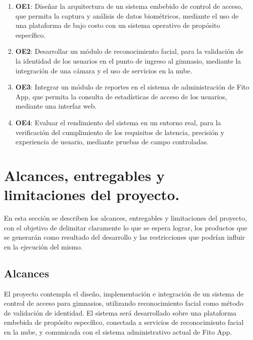 \begin{enumerate}
    \item \textbf{OE1}: Diseñar la arquitectura de un sistema embebido de control de acceso, %
    que permita la captura y análisis de datos biométricos, mediante el uso de una plataforma de bajo costo con un sistema operativo de propósito específico.

    \item \textbf{OE2}: Desarrollar un módulo de reconocimiento facial, para la validación de la identidad de los usuarios en el punto de ingreso al gimnasio, mediante la integración de una cámara y el uso de servicios en la nube. %
    
    \item \textbf{OE3}: Integrar un módulo de reportes en el sistema de administración de Fito App, %
    que permita la consulta de estadísticas de acceso de los usuarios, mediante %
    una interfaz web.
    
    \item \textbf{OE4}: Evaluar el rendimiento del sistema en un entorno real, para la verificación del cumplimiento de los requisitos de latencia, precisión y experiencia de usuario, mediante pruebas de campo controladas. %

\end{enumerate}

\section{Alcances, entregables y limitaciones del proyecto.}
En esta sección se describen los alcances, entregables y limitaciones del proyecto, con el objetivo de delimitar claramente lo que se espera lograr, los productos que se generarán como resultado del desarrollo y las restricciones que podrían influir en la ejecución del mismo.

\subsection{Alcances}
El proyecto contempla el diseño, implementación e integración de un sistema de control de acceso para gimnasios, utilizando reconocimiento facial como método de validación de identidad. El sistema será desarrollado sobre una plataforma embebida de propósito específico, conectada a servicios de reconocimiento facial en la nube, y comunicada con el sistema administrativo actual de Fito App.

